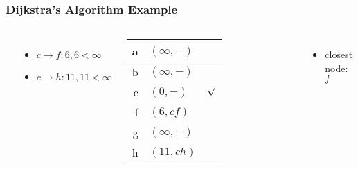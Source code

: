 \documentclass[dvipsnames]{beamer}
\begin{document}
\begin{frame}
  \frametitle{Dijkstra's Algorithm Example}

  \begin{example}[From node $c$ - base distance=$0$]
    \begin{columns}
      \begin{center}
      \end{center}

      \begin{itemize}
        \item $c \rightarrow f: 6, 6 < \infty$
        \item $c \rightarrow h: 11, 11 < \infty$
      \end{itemize}

      \pause
      \begin{table}
        \begin{tabular}{r|l|c}
          a & $(\infty,-)$ & \\\hline
          b & $(\infty,-)$ & \\\hline
          c & $(0,-)$      & $\surd$ \\\hline
          f & $(6,cf)$     & \\\hline
          g & $(\infty,-)$ & \\\hline
          h & $(11,ch)$    &
        \end{tabular}
      \end{table}

      \pause
      \begin{itemize}
        \item closest node: $f$
      \end{itemize}
    \end{columns}
  \end{example}
\end{frame}
\end{document}
